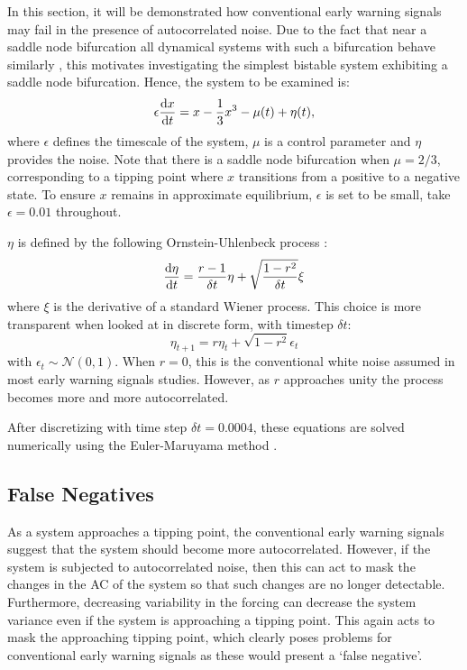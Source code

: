 In this section, it will be demonstrated how conventional early warning signals may fail in the presence of autocorrelated  noise. Due to the fact that near a
saddle node bifurcation all dynamical systems with such a
bifurcation behave similarly \parencite{guckenheimer2013}, this motivates investigating 
the simplest bistable system exhibiting a saddle node
bifurcation. Hence, the system to be examined is: 
\begin{equation}
    \label{eq:dynamical_system}
    \epsilon\dv{x}{t} =  x - \frac{1}{3}x^3 - \mu(t) + \eta(t),
\end{equation}
where $\epsilon$ defines the timescale of the system, $\mu$ is a control parameter and $\eta$ provides the noise. Note that there is a saddle node bifurcation
when $\mu = 2/3$, corresponding to a tipping point where
$x$ transitions from a positive to a negative state. To ensure
$x$ remains in approximate equilibrium, $\epsilon$ is set to be small,
take $\epsilon = 0.01$ throughout.


$\eta$ is defined by the following Ornstein-Uhlenbeck process \parencite{Uhlenbeck1930}:
\begin{equation}
\label{eq:white_red_forcing}
    \dv{\eta}{t} = \frac{r-1}{\delta t}\eta + \sqrt{\frac{1-r^2}{\delta t}} \xi
\end{equation}
where $\xi$ is the derivative of a standard Wiener process. 
This choice is more transparent when looked at in discrete form, with timestep 
$\delta t$:
\begin{equation}
    \label{eq:discretized_white_or_red_noise}
    \eta_{t+1} = r\eta_t + \sqrt{1-r^2} \epsilon_t
\end{equation}
with $\epsilon_t \sim \mathcal{N}(0,1)$. When $r = 0$, this is 
the conventional white noise assumed in most early warning signals
studies. However, as $r$ approaches unity the process becomes
more and more autocorrelated.

After discretizing with time step $\delta t = 0.0004$,
these equations are solved numerically using the 
Euler-Maruyama method \parencite{Jacobs2010}.


\subsection{False Negatives}
As a system approaches a tipping point, the conventional
early warning signals suggest that the system should become more
autocorrelated. However, if the system is subjected to autocorrelated noise,
then this can act to mask the changes in the AC of the system so that such
changes are no longer detectable. Furthermore, decreasing variability in
the forcing can decrease the system variance even if the system is 
approaching a tipping point. This again acts to mask the approaching tipping point, which clearly poses problems for conventional
early warning signals as these would present a `false negative'.

